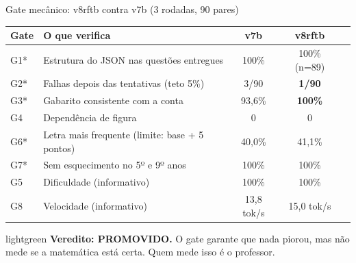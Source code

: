 \documentclass[aspectratio=169,11pt]{beamer}
\newcommand{\okmark}{{\color{okgreen}\faCheckCircle}}
\begin{document}
\begin{frame}{Gate mecânico: v8rftb contra v7b (3 rodadas, 90 pares)}
  \centering
  \footnotesize
  \begin{tabularx}{\textwidth}{@{}l>{\raggedright\arraybackslash}Xccc@{}}
    \toprule
    Gate & O que verifica & v7b & v8rftb & \\
    \midrule
    G1* & Estrutura do JSON nas questões entregues & 100\% & 100\% (n=89) & \okmark \\
    G2* & Falhas depois das tentativas (teto 5\%) & 3/90 & \textbf{1/90} & \okmark \\
    G3* & Gabarito consistente com a conta & 93,6\% & \textbf{100\%} & \okmark \\
    G4  & Dependência de figura & 0 & 0 & \okmark \\
    G6* & Letra mais frequente (limite: base + 5 pontos) & 40,0\% & 41,1\% & \okmark \\
    G7* & Sem esquecimento no 5º e 9º anos & 100\% & 100\% & \okmark \\
    \midrule
    G5  & Dificuldade (informativo) & 100\% & 100\% & \okmark \\
    G8  & Velocidade (informativo) & 13,8 tok/s & 15,0 tok/s & \okmark \\
    \bottomrule
  \end{tabularx}
  \vspace{6pt}

  \begin{caixa}{lightgreen}
    \textbf{Veredito: PROMOVIDO.} O gate garante que nada piorou, mas não mede se a matemática está certa.
    Quem mede isso é o professor.
  \end{caixa}
\end{frame}
\end{document}
